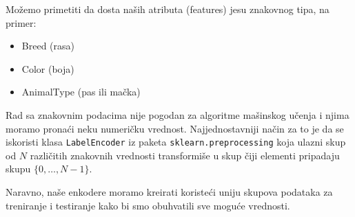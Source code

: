\documentclass[11pt]{article}
\begin{document}
    Možemo primetiti da dosta naših atributa (features) jesu znakovnog tipa,
na primer: 
\begin{itemize}
\item Breed (rasa)
\item Color (boja)
\item AnimalType (pas ili mačka)
\end{itemize}

Rad sa znakovnim podacima nije pogodan za algoritme mašinskog učenja i
njima moramo pronaći neku numeričku vrednost. Najjednostavniji način za
to je da se iskoristi klasa \texttt{LabelEncoder} iz paketa
\texttt{sklearn.preprocessing} koja ulazni skup od \(N\) različitih
znakovnih vrednosti transformiše u skup čiji elementi pripadaju skupu
\(\{0, \dots, N-1\}\).

Naravno, naše enkodere moramo kreirati koristeći uniju skupova podataka
za treniranje i testiranje kako bi smo obuhvatili sve moguće vrednosti.

\newpage
\end{document}
